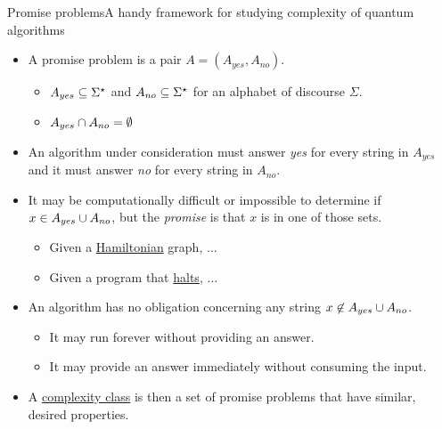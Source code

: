 \begin{frame}{Promise problems}{A handy framework for studying complexity of quantum algorithms}

\begin{itemize}[<+->]
    \item A promise problem is a pair $A=(A_{yes}, A_{no})$.
    \begin{itemize}
        \item $A_{yes} \subseteq \Sigma^{\star}$ and $A_{no} \subseteq \Sigma^{\star}$ for an alphabet of discourse $\Sigma$.
        \item $A_{yes} \cap A_{no}=\emptyset$
    \end{itemize}
    \item An algorithm under consideration must answer \emph{yes} for every string in $A_{yes}$ and it must answer \emph{no} for every string in $A_{no}$.
    
    \item It may be computationally difficult or impossible to determine if $x \in A_{yes} \cup A_{no}$, but the \emph{promise} is that $x$ is in one of those sets.
    \begin{itemize}
        \item Given a \href{https://en.wikipedia.org/wiki/Hamiltonian_path}{Hamiltonian} graph, $\ldots$
        \item Given a program that \href{https://en.wikipedia.org/wiki/Halting_problem}{halts}, $\ldots$
    \end{itemize}
    \item An algorithm has no obligation concerning any string $x\not\in A_{yes} \cup A_{no}$.
    \begin{itemize}
        \item It may run forever without providing an answer.
        \item It may provide an answer immediately without consuming the input.
    \end{itemize}
    \item A \href{https://en.wikipedia.org/wiki/Complexity_class}{complexity class} is then a set of promise problems that have similar, desired properties.
\end{itemize}
    
\end{frame}
